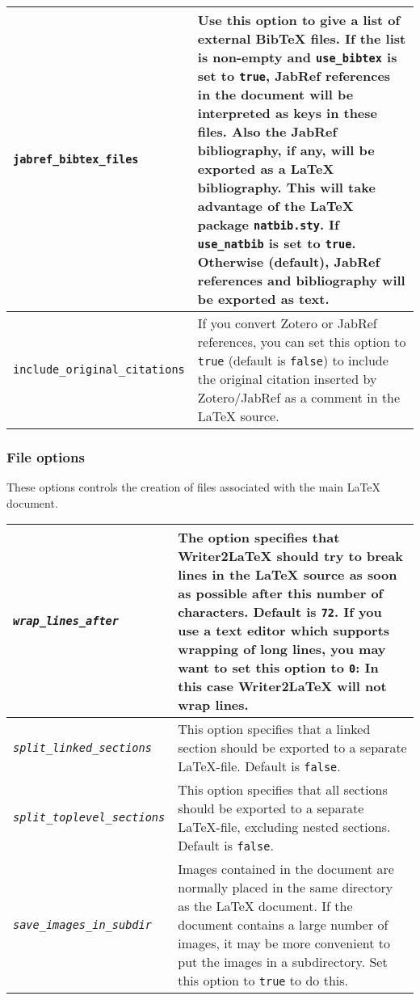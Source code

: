 \documentclass{article}
\newcommand\textstyleSourceText[1]{\texttt{\textmd{#1}}}
\begin{document}
\begin{center}
\begin{tabular}{|l|l|}
\mdseries \textstyleSourceText{jabref\_bibtex\_files} & \mdseries Use this option to give a list of external BibTeX files. If the list is non-empty and \textstyleSourceText{use\_bibtex} is set to \textstyleSourceText{true}, JabRef references in the document will be interpreted as keys in these files. Also the JabRef bibliography, if any, will be exported as a LaTeX bibliography. This will take advantage of the LaTeX package \textstyleSourceText{natbib.sty}. If \textstyleSourceText{use\_natbib} is set to \textstyleSourceText{true}. Otherwise (default), JabRef references and bibliography will be exported as text.\\\hline
\mdseries \textstyleSourceText{include\_original\_citations} & \mdseries If you convert Zotero or JabRef references, you can set this option to \textstyleSourceText{true} (default is \textstyleSourceText{false}) to include the original citation inserted by Zotero/JabRef as a comment in the LaTeX source.\\\hline
\end{tabular}
\end{center}
\subsubsection{File options}
{\mdseries
These options controls the creation of files associated with the main LaTeX document.}

\begin{center}
\begin{tabular}{|l|l|}

\hline
\mdseries \textstyleSourceText{\emph{wrap\_lines\_after}} & \mdseries The option specifies that Writer2LaTeX should try to break lines in the LaTeX source as soon as possible after this number of characters. Default is \textstyleSourceText{72}. If you use a text editor which supports wrapping of long lines, you may want to set this option to \textstyleSourceText{0}: In this case Writer2LaTeX will not wrap lines.\\\hline
\mdseries \textstyleSourceText{\emph{split\_linked\_sections}} & \mdseries This option specifies that a linked section should be exported to a separate LaTeX-file. Default is \textstyleSourceText{false}.\\\hline
\mdseries \textstyleSourceText{\emph{split\_toplevel\_sections}} & \mdseries This option specifies that all sections should be exported to a separate LaTeX-file, excluding nested sections. Default is \textstyleSourceText{false}.\\\hline
\mdseries \textstyleSourceText{\emph{save\_images\_in\_subdir}} & \mdseries Images contained in the document are normally placed in the same directory as the LaTeX document. If the document contains a large number of images, it may be more convenient to put the images in a subdirectory. Set this option to \textstyleSourceText{true} to do this.\\\hline
\end{tabular}
\end{center}
\end{document}
